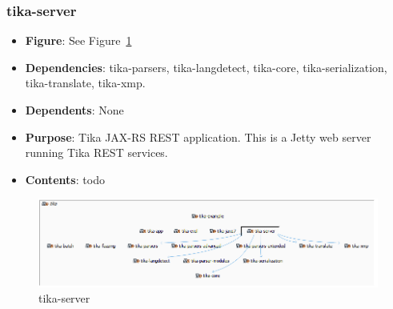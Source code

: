 \documentclass{article}
\begin{document}
\subsubsection{tika-server}
\begin {itemize}
\item \textbf{Figure}: See Figure~\ref{fig:tika-server}
\item \textbf{Dependencies}: tika-parsers, tika-langdetect, tika-core, tika-serialization, tika-translate, tika-xmp.
\item \textbf{Dependents}: None
\item \textbf{Purpose}: Tika JAX-RS REST application. This is a Jetty web server running Tika REST services.
\item \textbf{Contents}: todo
\end{itemize}
\begin{figure}[h!]
    \centering
    \includegraphics[width=1\textwidth]{report/images/tika-server.PNG}
    \caption{tika-server}
    \label{fig:tika-server}
\end{figure}
\end{document}
